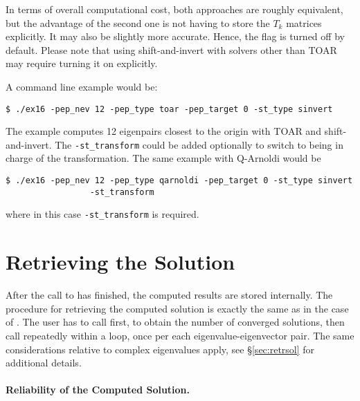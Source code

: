 In terms of overall computational cost, both approaches are roughly equivalent, but the advantage of the second one is not having to store the $T_k$ matrices explicitly. It may also be slightly more accurate. Hence, the  flag is turned off by default. Please note that using shift-and-invert with solvers other than TOAR may require turning it on explicitly.

A command line example would be:
	\begin{Verbatim}[fontsize=\small]
	$ ./ex16 -pep_nev 12 -pep_type toar -pep_target 0 -st_type sinvert
	\end{Verbatim}
The example computes 12 eigenpairs closest to the origin with TOAR and shift-and-invert. The \Verb!-st_transform! could be added optionally to switch to  being in charge of the transformation. The same example with Q-Arnoldi would be
	\begin{Verbatim}[fontsize=\small]
	$ ./ex16 -pep_nev 12 -pep_type qarnoldi -pep_target 0 -st_type sinvert
                 -st_transform
	\end{Verbatim}
where in this case \Verb!-st_transform! is required.

\section{Retrieving the Solution}

After the call to  has finished, the computed results are stored internally. The procedure for retrieving the computed solution is exactly the same as in the case of . The user has to call  first, to obtain the number of converged solutions, then call  repeatedly within a loop, once per each eigenvalue-eigenvector pair. The same considerations relative to complex eigenvalues apply, see \S\ref{sec:retrsol} for additional details.

\paragraph{Reliability of the Computed Solution.}

